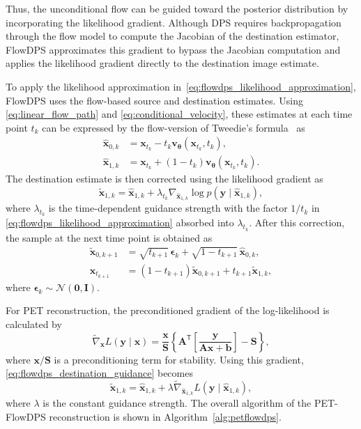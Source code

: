 \documentclass[journal]{IEEEtran}
\begin{document}
Thus, the unconditional flow can be guided toward the posterior distribution by incorporating the likelihood gradient. Although DPS requires backpropagation through the flow model to compute the Jacobian of the destination estimator, FlowDPS approximates this gradient to bypass the Jacobian computation and applies the likelihood gradient directly to the destination image estimate.

To apply the likelihood approximation in~\eqref{eq:flowdps_likelihood_approximation}, FlowDPS uses the flow-based source and destination estimates. Using \eqref{eq:linear_flow_path} and \eqref{eq:conditional_velocity}, these estimates at each time point $t_k$ can be expressed by the flow-version of Tweedie's formula~\cite{Kim_2025_ICCV} as
\begin{align}
\hat{\bm{x}}_{0,k}
&= \bm{x}_{t_k} - t_k\bm{v}_{\bm{\theta}}(\bm{x}_{t_k},t_k),
\\ \hat{\bm{x}}_{1,k} &= \bm{x}_{t_k} + (1-t_k)\bm{v}_{\bm{\theta}}(\bm{x}_{t_k},t_k).
\end{align}
The destination estimate is then corrected using the likelihood gradient as
\begin{equation}
\tilde{\bm{x}}_{1,k} = \hat{\bm{x}}_{1,k} + \lambda_{t_k} \nabla_{\hat{\bm{x}}_{1,k}} \log p\left( \bm{y}\mid \hat{\bm{x}}_{1,k}  \right),
\label{eq:flowdps_destination_guidance}
\end{equation}
where $\lambda_{t_k}$ is the time-dependent guidance strength with the factor $1/t_k$ in \eqref{eq:flowdps_likelihood_approximation} absorbed into $\lambda_{t_k}$. After this correction, the sample at the next time point is obtained as
\begin{align}
\tilde{\bm{x}}_{0,k+1} &= \sqrt{t_{k+1}}\,\bm{\epsilon}_k + \sqrt{1-t_{k+1}}\,\hat{\bm{x}}_{0,k},
\\ \bm{x}_{t_{k+1}} &= (1-t_{k+1})\tilde{\bm{x}}_{0,k+1} + t_{k+1}\tilde{\bm{x}}_{1,k},
\end{align}
where $\bm{\epsilon}_k\sim\mathcal{N}(\bm{0},\bm{I})$.

For PET reconstruction, the preconditioned gradient of the log-likelihood is calculated by
\begin{equation}
\tilde{\nabla}_{\bm{x}} L(\bm{y}\mid\bm{x}) = \frac{\bm{x}}{\bm{S}} \left\{\bm{A}^{\mathsf{T}} \left[ \frac{\bm{y}} {\bm{A}\bm{x}+\bm{b}} \right] - \bm{S} \right\},
\label{eq:flowdps_pet_gradient}
\end{equation}
where ${\bm{x}}/{\bm{S}}$ is a preconditioning term for stability. Using this gradient, \eqref{eq:flowdps_destination_guidance} becomes
\begin{equation}
\tilde{\bm{x}}_{1,k} = \hat{\bm{x}}_{1,k} + \lambda \tilde{\nabla}_{\hat{\bm{x}}_{1,k}} L(\bm{y}\mid\hat{\bm{x}}_{1,k}),
\label{eq:pet_flowdps_destination_guidance}
\end{equation}
where $\lambda$ is the constant guidance strength. The overall algorithm of the PET-FlowDPS reconstruction is shown in Algorithm~\ref{alg:petflowdps}.
\end{document}
